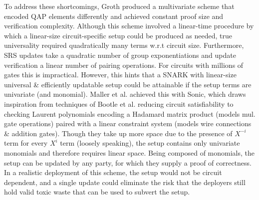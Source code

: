 \noindent To address these shortcomings, Groth \cite{grothupdatable} produced a multivariate scheme that encoded QAP elements differently and achieved constant proof size and verification complexity. Although this scheme involved a linear-time procedure by which a linear-size circuit-specific setup could be produced as needed, true universality required quadratically many terms w.r.t circuit size. Furthermore, SRS updates take a quadratic number of group exponentiations and update verification a linear number of pairing operations. For circuits with millions of gates this is impractical. However, this hints that a SNARK with linear-size universal \& efficiently updatable setup could be attainable if the setup terms are univariate (and monomial). Maller et al. achieved this with Sonic, which draws inspiration from techniques of Bootle et al. \cite{bootlezkargs} reducing circuit satisfiability to checking Laurent polynomials encoding a Hadamard matrix product (models mul. gate operations) paired with a linear constraint system (models wire connections \& addition gates). Though they take up more space due to the presence of $X^{-i}$ term for every $X^i$ term (loosely speaking), the setup contains only univariate monomials and therefore requires linear space. Being composed of monomials, the setup can be updated by any party, for which they supply a proof of correctness. In a realistic deployment of this scheme, the setup would not be circuit dependent, and a single update could eliminate the risk that the deployers still hold valid toxic waste that can be used to subvert the setup.\\ 

